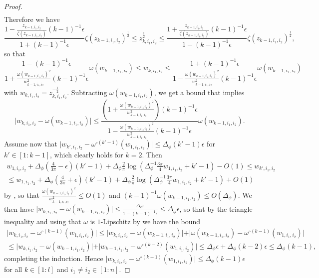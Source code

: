 \documentclass[twoside,11pt]{article}
\begin{document}
\begin{proof}
\begin{multline*}
\end{multline*}
Therefore we have
\[
\frac{1 - \frac{z_{k-1,i_1,i_2}}{\zeta(z_{k-1,i_1,i_2})} (k-1)^{-1} \epsilon}{1+(k-1)^{-1}\epsilon} \zeta(z_{k-1,i_1,i_2})^{\frac{1}{2}}
\leq z_{k,i_1,i_2}^{\frac{1}{2}}
\leq \frac{1 + \frac{z_{k-1,i_1,i_2}}{\zeta(z_{k-1,i_1,i_2})} (k-1)^{-1} \epsilon}{1-(k-1)^{-1}\epsilon} \zeta(z_{k-1,i_1,i_2})^{\frac{1}{2}},
\]
so that
\[
\frac{1-(k-1)^{-1}\epsilon}{1 + \frac{\omega(w_{k-1,i_1,i_2})^2}{w_{k-1,i_1,i_2}^2} (k-1)^{-1} \epsilon} \omega(w_{k-1,i_1,i_2})
\leq w_{k,i_1,i_2}
\leq \frac{1+(k-1)^{-1}\epsilon}{1 - \frac{\omega(w_{k-1,i_1,i_2})^2}{w_{k-1,i_1,i_2}^2} (k-1)^{-1} \epsilon} \omega(w_{k-1,i_1,i_2})
\]
with $w_{k,i_1,i_2} = z_{k,i_1,i_2}^{-\frac{1}{2}}$. Subtracting $\omega(w_{k-1,i_1,i_2})$, we get a bound that implies
\[
\vert w_{k,i_1,i_2} - \omega(w_{k-1,i_1,i_2}) \vert
\leq \frac{\left( 1 + \frac{\omega(w_{k-1,i_1,i_2})^2}{w_{k-1,i_1,i_2}^2} \right) (k-1)^{-1} \epsilon}{1 - \frac{\omega(w_{k-1,i_1,i_2})^2}{w_{k-1,i_1,i_2}^2} (k-1)^{-1} \epsilon} \omega(w_{k-1,i_1,i_2}).
\]
Assume now that $\vert w_{k',i_1,i_2} - \omega^{\circ (k'-1)}(w_{1,i_1,i_2}) \vert \leq \Delta_\phi (k'-1) \epsilon$ for $k' \in [1:k-1]$, which clearly holds for $k=2$. Then 
\begin{multline*}
w_{1,i_1,i_2} + \Delta_\phi \left( \frac{4}{3\pi} - \epsilon \right) (k'-1) + \Delta_\phi \frac{2}{\pi} \log\left( \Delta_\phi^{-1} \frac{3\pi}{4} w_{1,i_1,i_2} + k' - 1 \right) - O(1) 
\leq w_{k',i_1,i_2} \\
\leq w_{1,i_1,i_2} + \Delta_\phi \left( \frac{4}{3\pi} + \epsilon \right) (k'-1) + \Delta_\phi \frac{2}{\pi} \log\left( \Delta_\phi^{-1} \frac{3\pi}{4} w_{1,i_1,i_2} + k' - 1 \right) + O(1)
\end{multline*}
by \citet[Proposition~13]{mlpsateoc1}, so that $\frac{\omega(w_{k-1,i_1,i_2})^2}{w_{k-1,i_1,i_2}^2} \leq O(1)$ and $(k-1)^{-1} \omega(w_{k-1,i_1,i_2}) \leq O(\Delta_\phi)$. We then have $\vert w_{k,i_1,i_2} - \omega(w_{k-1,i_1,i_2}) \vert \leq \frac{\Delta_\phi \epsilon}{1-(k-1)^{-1} \epsilon} \leq \Delta_\phi \epsilon$, so that by the triangle inequality and using that $\omega$ is $1$-Lipschitz by \citet[Proposition~12]{mlpsateoc1} we have the bound 
\begin{multline*}
\vert w_{k,i_1,i_2} - \omega^{\circ (k-1)}(w_{1,i_1,i_2}) \vert 
\leq \vert w_{k,i_1,i_2} - \omega(w_{k-1,i_1,i_2}) \vert + \vert \omega(w_{k-1,i_1,i_2}) - \omega^{\circ (k-1)}(w_{1,i_1,i_2}) \vert \\
\leq \vert w_{k,i_1,i_2} - \omega(w_{k-1,i_1,i_2}) \vert + \vert w_{k-1,i_1,i_2} - \omega^{\circ (k-2)}(w_{1,i_1,i_2}) \vert 
\leq \Delta_\phi \epsilon + \Delta_\phi (k-2) \epsilon 
\leq \Delta_\phi (k-1),
\end{multline*}
completing the induction. Hence $\vert w_{k,i_1,i_2} - \omega^{\circ (k-1)}(w_{1,i_1,i_2}) \vert \leq \Delta_\phi (k-1) \epsilon$ for all $k \in [1:l]$ and $i_1 \neq i_2 \in [1:n]$.


\end{proof}
\end{document}

